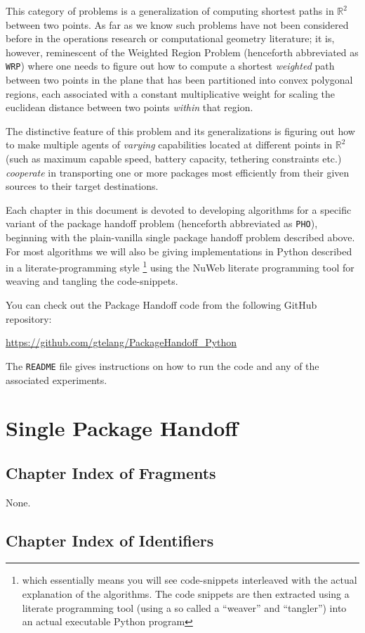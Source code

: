 \documentclass[12.0pt]{report}
\begin{document}
This category of problems is a generalization of computing shortest paths in $\mathbb{R}^2$ 
between 
two points. As far as we know such problems have not been considered before in the 
operations research or computational geometry literature; it is, however, reminescent of 
the Weighted Region Problem \cite{mitchell1991weighted} (henceforth abbreviated as 
\texttt{WRP}) where one needs to figure out how to compute a 
shortest \textit{weighted} path between two points in the plane
that has been partitioned into convex polygonal regions, each associated with a constant 
multiplicative weight for scaling the euclidean distance between two points 
\textit{within} that region.  


The distinctive feature of this problem and its generalizations is figuring out how 
to make multiple agents of \textit{varying} capabilities  located at different points 
in $\mathbb{R}^2$ (such as maximum capable speed, battery capacity, tethering constraints 
etc.) \textit{cooperate} in transporting one or more packages most efficiently 
from their given sources to their target destinations. 


Each chapter in this document is devoted to developing algorithms for a specific 
variant of the package handoff problem (henceforth abbreviated as \texttt{PHO}), beginning 
with the plain-vanilla single package handoff problem described above. 
For most algorithms we will also be giving implementations in Python described in a 
literate-programming style \footnote{which essentially means you will see code-snippets interleaved with the actual explanation of the algorithms. 
The code snippets are then extracted using a literate programming tool (using a so called a ``weaver'' and ``tangler'') into an actual 
executable Python program} \cite{knuth1984literate} using the NuWeb literate programming tool \cite{briggs2001nuweb}  
for weaving and tangling the code-snippets. 

You can check out the Package Handoff code from the following GitHub repository: 

\begin{center}
\url{https://github.com/gtelang/PackageHandoff_Python}
\end{center}

The \texttt{README} file gives instructions on how to run the code and any of the associated experiments. 
\chapter{Single Package Handoff}
\label{chap:single-package-handoff}






\section{Chapter Index of Fragments}
None.

\section{Chapter Index of Identifiers}
 


 


\begin{appendices}
\end{appendices}
\end{document}
